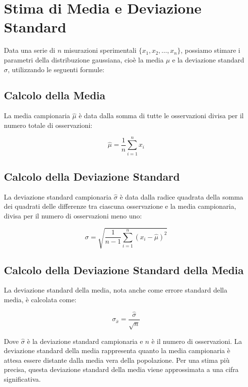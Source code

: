 \documentclass{article}
\begin{document}
\section{Stima di Media e Deviazione Standard}
Data una serie di $n$ misurazioni sperimentali $\{x_1, x_2, \ldots, x_n\}$, possiamo stimare i parametri della distribuzione gaussiana, cioè la media $\mu$ e la deviazione standard $\sigma$, utilizzando le seguenti formule:

\subsection{Calcolo della Media}
La media campionaria $\hat{\mu}$ è data dalla somma di tutte le osservazioni divisa per il numero totale di osservazioni:

\begin{equation}
\hat{\mu} = \frac{1}{n} \sum_{i=1}^{n} x_i
\end{equation}

\subsection{Calcolo della Deviazione Standard}
La deviazione standard campionaria $\hat{\sigma}$ è data dalla radice quadrata della somma dei quadrati delle differenze tra ciascuna osservazione e la media campionaria, divisa per il numero di osservazioni meno uno:

\begin{equation}
\hat{\sigma} = \sqrt{\frac{1}{n-1} \sum_{i=1}^{n} (x_i - \hat{\mu})^2}
\end{equation}

\subsection{Calcolo della Deviazione Standard della Media}
La deviazione standard della media, nota anche come errore standard della media, è calcolata come:

\begin{equation}
\sigma_{\overline{x}} = \frac{\hat{\sigma}}{\sqrt{n}}
\end{equation}

Dove $\hat{\sigma}$ è la deviazione standard campionaria e $n$ è il numero di osservazioni. La deviazione standard della media rappresenta quanto la media campionaria è attesa essere distante dalla media vera della popolazione. Per una stima più precisa, questa deviazione standard della media viene approssimata a una cifra significativa.
\end{document}
